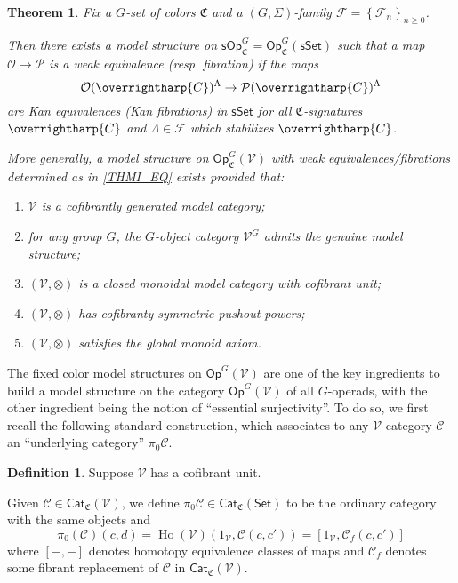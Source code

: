 \documentclass[a4paper,10pt
,draft
]{article}%
\numberwithin{equation}{section}
\numberwithin{figure}{section}
\newtheorem{theorem}[equation]{Theorem}%
\theoremstyle{definition} %
\newtheorem{definition}[equation]{Definition}%
\newcommand{\set}[1]{\left\{#1\right\}}%
\newcommand{\vect}[1]{\text{\overrightharp{\ensuremath{#1}}}}
\newcommand{\Cat}{\mathsf{Cat}}
\newcommand{\Op}{\mathsf{Op}}%
\DeclareMathOperator{\Ho}{Ho}
\newcommand{\F}{\ensuremath{\mathcal F}}
\newcommand{\V}{\ensuremath{\mathcal V}}
\renewcommand{\O}{\ensuremath{\mathcal O}}
\newcommand{\1}{\ensuremath{\mathbbm 1}}%
\begin{document}
 


\begin{theorem}\label{THMI}
Fix a $G$-set of colors $\mathfrak{C}$
and a $(G,\Sigma)$-family $\F = \set{\F_n}_{n \geq 0}$.

Then there exists a model structure on
$\mathsf{sOp}^G_{\mathfrak{C}} = 
\mathsf{Op}^G_{\mathfrak{C}}(\mathsf{sSet})$
such that a map
$\mathcal{O} \to \mathcal{P}$
is a weak equivalence (resp. fibration) if the maps
\begin{equation}\label{THMI_EQ}
	\O(\vect{C})^{\Lambda} \to \mathcal{P}(\vect{C})^{\Lambda}
\end{equation}
are Kan equivalences (Kan fibrations)
in $\mathsf{sSet}$
for all $\mathfrak{C}$-signatures $\vect{C}$
and $\Lambda \in \F$ which stabilizes $\vect{C}$.

More generally, a model structure on 
$\Op^G_{\mathfrak C}(\V)$
with weak equivalences/fibrations determined as in 
\eqref{THMI_EQ}
exists provided that:
\begin{enumerate}[label = (\roman*)]
	\item $\V$ is a cofibrantly generated model category;
	\item for any group $G$, the $G$-object category $\V^G$ admits the genuine model structure;
	\item $(\V, \otimes)$ is a closed monoidal model category with cofibrant unit;
	\item $(\V, \otimes)$ has cofibranty symmetric pushout powers;
	\item $(\V, \otimes)$ satisfies the global monoid axiom.
\end{enumerate}
\end{theorem}


The fixed color model structures
on $\mathsf{Op}^G(\V)$
are one of the key ingredients to build a model structure
on the category 
$\mathsf{Op}^G(\V)$
of all $G$-operads,
with the other ingredient being the notion of ``essential surjectivity''.
To do so, we first recall the following standard construction, 
which associates to any $\V$-category $\mathcal{C}$
an ``underlying category'' $\pi_0 \mathcal{C}$.

\begin{definition}\label{HTPY_DEFN}
	Suppose $\V$ has a cofibrant unit.

	Given $\mathcal C \in \Cat_{\mathfrak{C}}(\V)$,
	we define $\pi_0 \mathcal C \in \Cat_{\mathfrak{C}}(\mathsf{Set})$ 
	to be the ordinary category with the same objects and
\[
	\pi_0(\mathcal{C})(c,d)=
	\Ho(\V)(1_\V, \mathcal C(c,c'))=
	[1_\V, \mathcal{C}_f(c,c')]
\]
where $[-,-]$ denotes homotopy equivalence classes of maps
and $\mathcal{C}_f$ denotes some fibrant replacement of
$\mathcal C$ in $\Cat_{\mathfrak{C}}(\V)$.
\end{definition}
\end{document}
